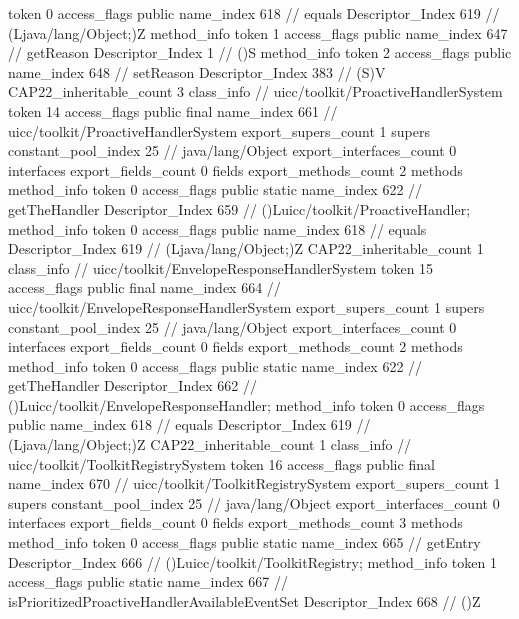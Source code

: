 {{{{{					token	0
					access_flags	public
					name_index	618		// equals
					Descriptor_Index	619		// (Ljava/lang/Object;)Z
				}
				method_info {
					token	1
					access_flags	public
					name_index	647		// getReason
					Descriptor_Index	1		// ()S
				}
				method_info {
					token	2
					access_flags	public
					name_index	648		// setReason
					Descriptor_Index	383		// (S)V
				}
			}
			CAP22_inheritable_count	3
		}
		class_info {		// uicc/toolkit/ProactiveHandlerSystem
			token	14
			access_flags	public final
			name_index	661		// uicc/toolkit/ProactiveHandlerSystem
			export_supers_count	1
			supers {
				constant_pool_index	25		// java/lang/Object
			}
			export_interfaces_count	0
			interfaces {
			}
			export_fields_count	0
			fields {
			}
			export_methods_count	2
			methods {
				method_info {
					token	0
					access_flags	public static
					name_index	622		// getTheHandler
					Descriptor_Index	659		// ()Luicc/toolkit/ProactiveHandler;
				}
				method_info {
					token	0
					access_flags	public
					name_index	618		// equals
					Descriptor_Index	619		// (Ljava/lang/Object;)Z
				}
			}
			CAP22_inheritable_count	1
		}
		class_info {		// uicc/toolkit/EnvelopeResponseHandlerSystem
			token	15
			access_flags	public final
			name_index	664		// uicc/toolkit/EnvelopeResponseHandlerSystem
			export_supers_count	1
			supers {
				constant_pool_index	25		// java/lang/Object
			}
			export_interfaces_count	0
			interfaces {
			}
			export_fields_count	0
			fields {
			}
			export_methods_count	2
			methods {
				method_info {
					token	0
					access_flags	public static
					name_index	622		// getTheHandler
					Descriptor_Index	662		// ()Luicc/toolkit/EnvelopeResponseHandler;
				}
				method_info {
					token	0
					access_flags	public
					name_index	618		// equals
					Descriptor_Index	619		// (Ljava/lang/Object;)Z
				}
			}
			CAP22_inheritable_count	1
		}
		class_info {		// uicc/toolkit/ToolkitRegistrySystem
			token	16
			access_flags	public final
			name_index	670		// uicc/toolkit/ToolkitRegistrySystem
			export_supers_count	1
			supers {
				constant_pool_index	25		// java/lang/Object
			}
			export_interfaces_count	0
			interfaces {
			}
			export_fields_count	0
			fields {
			}
			export_methods_count	3
			methods {
				method_info {
					token	0
					access_flags	public static
					name_index	665		// getEntry
					Descriptor_Index	666		// ()Luicc/toolkit/ToolkitRegistry;
				}
				method_info {
					token	1
					access_flags	public static
					name_index	667		// isPrioritizedProactiveHandlerAvailableEventSet
					Descriptor_Index	668		// ()Z
}}}}}

